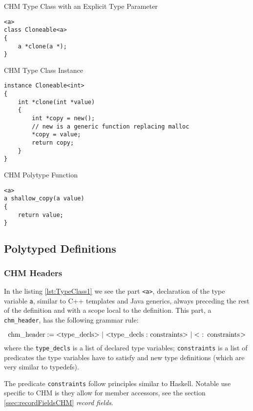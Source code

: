 \begin{listing}
\caption{CHM Type Class with an Explicit Type Parameter}
\label{lst:TypeClass2}
\begin{lstlisting}
<a>
class Cloneable<a>
{
    a *clone(a *);
}
\end{lstlisting}
\end{listing}

\begin{listing}
\caption{CHM Type Class Instance}
\label{lst:Instance}
\begin{lstlisting}
instance Cloneable<int>
{
    int *clone(int *value)
    {
        int *copy = new();
        // new is a generic function replacing malloc
        *copy = value;
        return copy;
    }
}
\end{lstlisting}
\end{listing}

\begin{listing}
\caption{CHM Polytype Function}
\label{lst:Function}
\begin{lstlisting}
<a>
a shallow_copy(a value)
{
    return value;
}
\end{lstlisting}
\end{listing}

\subsection{Polytyped Definitions}

\subsubsection{CHM Headers}
In the listing \ref{lst:TypeClass1} we see the part \lstinline{<a>}, declaration of the type variable \lstinline{a}, similar to C++ templates and Java generics, always preceding the rest of the definition and with a scope local to the definition. This part, a \lstinline{chm_header}, has the following grammar rule:

\begin{defn}
    $$\text{\lstinline{chm_header}} := \text{\lstinline{<type_decls>}}\ |\ \text{\lstinline{<type_decls : constraints>}}\ |\ \text{\lstinline{< : constraints>}}$$
    where the \lstinline{type_decls} is a list of declared type variables; \lstinline{constraints} is a list of predicates the type variables have to satisfy and new type definitions (which are very similar to typedefs).
\end{defn}

The predicate \lstinline{constraints} follow principles similar to Haskell. Notable use specific to CHM is they allow for member accessors, see the section \ref{ssec:recordFieldsCHM} \emph{record fields}.

